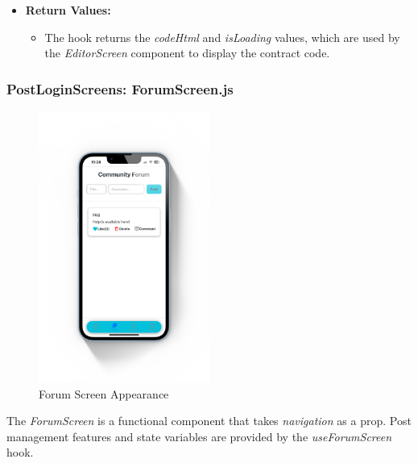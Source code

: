 \begin{itemize}
    \item \textbf{Return Values:}
    \begin{itemize}
        \item The hook returns the \textit{codeHtml} and \textit{isLoading} values, which are used by the \textit{EditorScreen} component to display the contract code.
    \end{itemize}
\end{itemize}

\subsubsection{PostLoginScreens: ForumScreen.js}

\begin{figure}[!ht]
    \centering
    \includegraphics[width=0.5\textwidth]
    {LATEX/Appendices/Images/Software/Frontend/forum_screen.png}
    \caption{Forum Screen Appearance}
    \label{fig:forum screen}
\end{figure} 

The \textit{ForumScreen} is a functional component that takes \textit{navigation} as a prop. Post management features and state variables are provided by the \textit{useForumScreen} hook.

